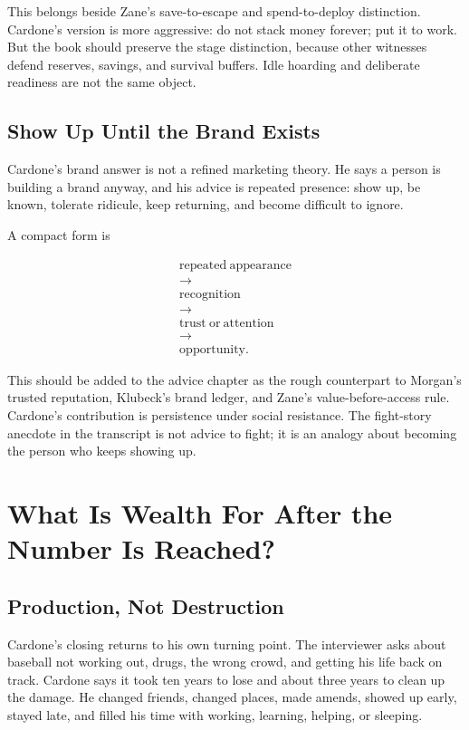 \documentclass[11pt,oneside]{book}
\begin{document}
This belongs beside Zane's save-to-escape and spend-to-deploy distinction. Cardone's version is more aggressive: do not stack money forever; put it to work. But the book should preserve the stage distinction, because other witnesses defend reserves, savings, and survival buffers. Idle hoarding and deliberate readiness are not the same object.

\section{Show Up Until the Brand Exists}

Cardone's brand answer is not a refined marketing theory. He says a person is building a brand anyway, and his advice is repeated presence: show up, be known, tolerate ridicule, keep returning, and become difficult to ignore.

A compact form is

\begin{equation}
\begin{gathered}
\mathrm{repeated\ appearance}\\
\longrightarrow\\
\mathrm{recognition}\\
\longrightarrow\\
\mathrm{trust\ or\ attention}\\
\longrightarrow\\
\mathrm{opportunity}.
\end{gathered}
\end{equation}

This should be added to the advice chapter as the rough counterpart to Morgan's trusted reputation, Klubeck's brand ledger, and Zane's value-before-access rule. Cardone's contribution is persistence under social resistance. The fight-story anecdote in the transcript is not advice to fight; it is an analogy about becoming the person who keeps showing up.

\chapter{What Is Wealth For After the Number Is Reached?}

\section{Production, Not Destruction}

Cardone's closing returns to his own turning point. The interviewer asks about baseball not working out, drugs, the wrong crowd, and getting his life back on track. Cardone says it took ten years to lose and about three years to clean up the damage. He changed friends, changed places, made amends, showed up early, stayed late, and filled his time with working, learning, helping, or sleeping.
\end{document}
